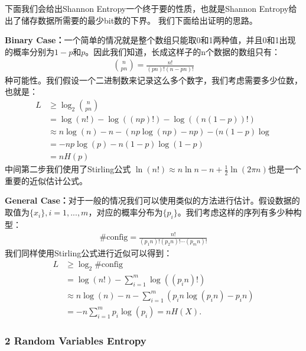 \bigskip
{}

下面我们会给出Shannon Entropy一个终于要的性质，也就是Shannon Entropy给出了储存数据所需要的最少bit数的下界。
我们下面给出证明的思路。

\textbf{Binary Case：}一个简单的情况就是整个数组只能取0和1两种值，并且0和1出现的概率分别为$ 1- p $和$ p
$。因此我们知道，长成这样子的n个数据的数组只有：
\begin{align}
  \binom{n}{pn} = \frac{n!}{(pn)!(n-pn)!}
\end{align}
种可能性。我们假设一个二进制数来记录这么多个数字，我们考虑需要多少位数，也就是：
\begin{align}
  L &\geq \log_2 \binom{n}{pn} \\
  &=\log(n!)-\log((np)!)-\log((n(1-p))!)\\
  &\approx n\log(n)-n-(np\log(np)-np)-(n(1-p)\log\\
    &=-np\log(p)-n(1-p)\log(1-p)\\
    &=nH(p)
  \end{align}
  中间第二步我们使用了Stirling公式 $ \ln(n!)\approx n\ln n-n+\frac{1}{2}\ln(2\pi
  n) $也是一个重要的近似估计公式。

  \textbf{General Case：}对于一般的情况我们可以使用类似的方法进行估计。假设数据的取值为$ \{x_i\}, i =
  1,...,m $，对应的概率分布为$ \{p_i\} $。我们考虑这样的序列有多少种构型：
  \begin{align}
    \# \text{config} = \frac{n!}{(p_1 n)!(p_2 n)! \cdots (p_m n)!}
  \end{align}
  我们同样使用Stirling公式进行近似可以得到：
  \begin{align}
    L &\geq \log_2 \# \text{config} \\
    &= \log(n!) - \sum_{i=1}^m \log((p_i n)!) \\
    &\approx n\log(n) - n - \sum_{i=1}^m (p_i n \log(p_i n) - p_i n) \\
    &= -n \sum_{i=1}^m p_i \log(p_i) = n H(X).
  \end{align}

  \subsubsection{2 Random Variables Entropy}

